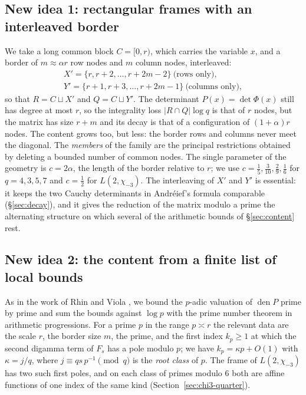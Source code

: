 \documentclass[11pt]{amsart}
\theoremstyle{definition}
\theoremstyle{remark}
\numberwithin{equation}{section}
\newcommand{\den}{\operatorname{den}}
\begin{document}
\subsection{New idea 1: rectangular frames with an interleaved border}
We take a long common block $C=[0,r)$, which carries the variable $x$, and a border of $m\approx\alpha r$ row nodes and
$m$ column nodes, interleaved:
\[
\begin{gathered}
 X'=\{r,r+2,\dots,r+2m-2\}\ \text{(rows only)},\\ Y'=\{r+1,r+3,\dots,r+2m-1\}\ \text{(columns only)},
\end{gathered}
\]
so that $R=C\sqcup X'$ and $Q=C\sqcup Y'$. The determinant $P(x)=\det\Phi(x)$ still has degree at most $r$, so the
integrality loss $|R\cap Q|\log q$ is that of $r$ nodes, but the matrix has size $r+m$ and its decay is that of a
configuration of $(1+\alpha)r$ nodes. The content grows too, but less: the border rows and columns never meet the
diagonal. The \emph{members} of the family are the principal restrictions obtained by deleting a bounded number of
common nodes. The single parameter of the geometry is $c=2\alpha$, the length of the border relative to $r$; we use
$c=\frac15,\frac3{10},\frac29,\frac16$ for $q=4,3,5,7$ and $c=\frac12$ for $L(2,\chi_{-3})$. The interleaving of $X'$
and $Y'$ is essential: it keeps the two Cauchy determinants in Andr\'eief's formula comparable (\S\ref{sec:decay}),
and it gives the reduction of the matrix modulo a prime the alternating structure on which several of the arithmetic
bounds of \S\ref{sec:content} rest.

\subsection{New idea 2: the content from a finite list of local bounds}
As in the work of Rhin and Viola \cite{RhinViola96,RhinViola01}, we bound the $p$-adic valuation of
$\den P$ prime by prime and sum the bounds against $\log p$ with the prime number theorem in arithmetic progressions.
For a prime $p$ in the range $p\asymp r$ the relevant data are the scale $r$, the border size $m$, the prime, and the
first index $k_p\ge1$ at which the second digamma term of $F_s$ has a pole modulo $p$; we have $k_p=\kappa p+O(1)$
with $\kappa=j/q$, where $j\equiv qs\,p^{-1}\pmod q$ is the \emph{root class} of $p$. The frame of $L(2,\chi_{-3})$ has two
such first poles, and on each class of primes modulo $6$ both are affine functions of one index of the same kind
(Section~\ref{sec:chi3-quarter}).
\end{document}
